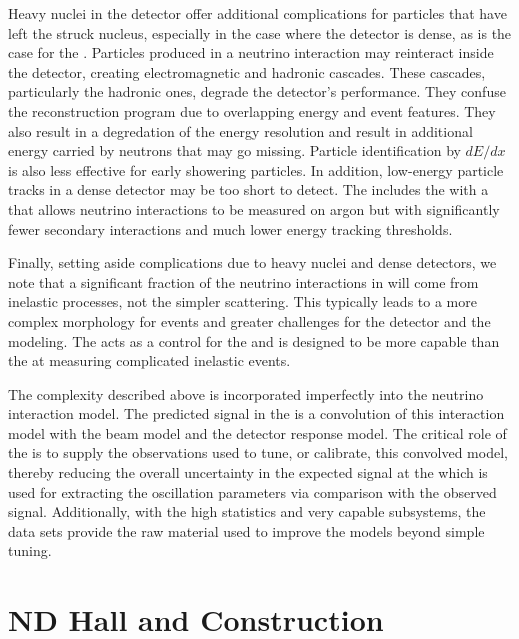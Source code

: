 Heavy nuclei in the detector offer additional complications for particles that have left the struck nucleus, especially in the case where the detector is dense, as is the case for the . Particles produced in a neutrino interaction may  reinteract inside the detector, creating electromagnetic and hadronic cascades. These cascades, particularly the hadronic ones, degrade the detector's performance. They confuse the reconstruction program due to overlapping energy and event features. They also result in a degredation of the energy resolution and result in additional energy carried by neutrons that may go missing. Particle identification by $dE/dx$ is also less effective for early showering particles. In addition, low-energy particle tracks in a dense detector may be too short to detect.  The   includes the  with a  that allows neutrino interactions to be measured on argon but with significantly fewer secondary interactions and much lower energy tracking thresholds.



Finally, setting aside complications due to heavy nuclei and dense detectors, we note that a significant fraction of the neutrino interactions in  will come from inelastic processes, not the simpler  scattering. 
This typically leads to a more complex morphology for events and greater challenges for the detector and the modeling.  The   acts as a control for the  and is designed to be more capable than the  at measuring complicated inelastic events.

The complexity described above is incorporated imperfectly into the neutrino interaction model. The predicted signal in the  is a convolution of this interaction model with the beam model and the detector response model.  The critical role of  the   is to supply the observations used to tune, or calibrate, this convolved model, thereby reducing the overall uncertainty in the expected signal at the  which is used for extracting the oscillation parameters via comparison with the observed signal.  Additionally, with the high statistics and very capable subsystems, the  data sets provide the raw material used to improve the models beyond simple tuning.  


\section{ND Hall and Construction}
\label{sec:exsum-nd-hall}
%

